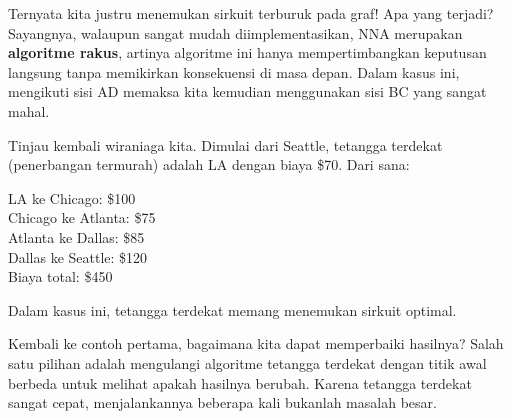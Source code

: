 Ternyata kita justru menemukan sirkuit terburuk pada graf!  Apa yang terjadi?  Sayangnya, walaupun sangat mudah diimplementasikan, NNA merupakan \textbf{algoritme rakus}, artinya algoritme ini hanya mempertimbangkan keputusan langsung tanpa memikirkan konsekuensi di masa depan.  Dalam kasus ini, mengikuti sisi AD memaksa kita kemudian menggunakan sisi BC yang sangat mahal.

\begin{example}{}%
Tinjau kembali wiraniaga kita.  Dimulai dari Seattle, tetangga terdekat (penerbangan termurah) adalah LA dengan biaya \$70.  Dari sana:

\begin{minipage}{0.5\textwidth}
\noindent LA ke Chicago:  \$100\\
Chicago ke Atlanta: \$75\\
Atlanta ke Dallas: \$85\\
Dallas ke Seattle: \$120\\
Biaya total: \$450\\
\end{minipage}
%
\begin{minipage}{0.5\textwidth}
\end{minipage}

\noindent Dalam kasus ini, tetangga terdekat memang menemukan sirkuit optimal.  
\end{example}

Kembali ke contoh pertama, bagaimana kita dapat memperbaiki hasilnya?  Salah satu pilihan adalah mengulangi algoritme tetangga terdekat dengan titik awal berbeda untuk melihat apakah hasilnya berubah.  Karena tetangga terdekat sangat cepat, menjalankannya beberapa kali bukanlah masalah besar.

